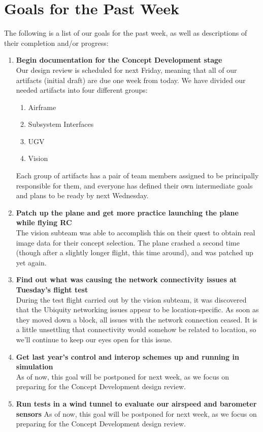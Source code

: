 \documentclass[]{../auvsi_doc}
\begin{document}
\section{Goals for the Past Week}

The following is a list of our goals for the past week, as well as descriptions of their completion and/or progress:

\begin{enumerate}
\item \textbf{Begin documentation for the Concept Development stage}\\
Our design review is scheduled for next Friday, meaning that all of our artifacts (initial draft) are due one week from today. We have divided our needed artifacts into four different groups:
\begin{enumerate}
	\item Airframe
	\item Subsystem Interfaces
	\item UGV
	\item Vision
\end{enumerate}
Each group of artifacts has a pair of team members assigned to be principally responsible for them, and everyone has defined their own intermediate goals and plans to be ready by next Wednesday. 
\item \textbf{Patch up the plane and get more practice launching the plane while flying RC}\\
The vision subteam was able to accomplish this on their quest to obtain real image data for their concept selection. The plane crashed a second time (though after a slightly longer flight, this time around), and was patched up yet again.
\item \textbf{Find out what was causing the network connectivity issues at Tuesday's flight test}\\
During the test flight carried out by the vision subteam, it was discovered that the Ubiquity networking issues appear to be location-specific. As soon as they moved down a block, all issues with the network connection ceased. It is a little unsettling that connectivity would somehow be related to location, so we'll continue to keep our eyes open for this issue.
\item \textbf{Get last year's control and interop schemes up and running in simulation}\\
As of now, this goal will be postponed for next week, as we focus on preparing for the Concept Development design review.
\item \textbf{Run tests in a wind tunnel to evaluate our airspeed and barometer sensors}
As of now, this goal will be postponed for next week, as we focus on preparing for the Concept Development design review.
\end{enumerate}
\end{document}
